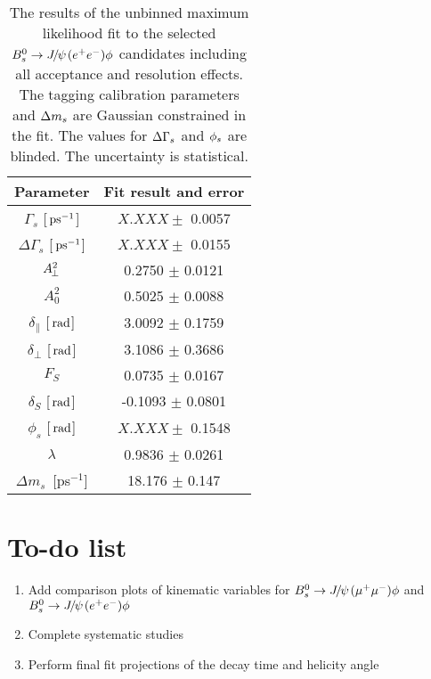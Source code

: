 \begin{table}[htb]
  \caption{
   The results of the unbinned maximum likelihood fit to the selected ${{B}^0_{s}}\rightarrow{\ensuremath{{J\mskip -3mu/\mskip -2mu\psi\mskip 2mu}}}({e^+e^-})\phi$ candidates including all acceptance and resolution effects. The tagging calibration parameters and ${\Delta m_{{s}}}$ are Gaussian constrained in the fit. The values for ${\Delta\Gamma_{{s}}}$ and ${\phi_{{s}}}$ are blinded. The uncertainty is statistical.
}
    \small{
\begin{center}\begin{tabular}{cc}
Parameter & Fit result and error \\ 		\hline
            $\Gamma_{s}$ [${\mathrm{ \,ps}}^{-1}$] &       $X.XXX \pm$ 0.0057                \\
      $\Delta\Gamma_{s}$ [${\mathrm{ \,ps}}^{-1}$]&         $X.XXX \pm$  0.0155                \\
$A_{\hspace{-1pt}\perp}^{2}$ &      0.2750 $\pm$   0.0121                \\
             $A_0^2$ &      0.5025 $\pm$  0.0088                \\
  $\delta_\parallel$ [$\mathrm{ \,rad}$] &       3.0092 $\pm$    0.1759                \\
      $\delta_\perp$ [$\mathrm{ \,rad}$] &          3.1086 $\pm$    0.3686                \\
               $F_S$ &     0.0735 $\pm$   0.0167                \\
          $\delta_S$ [$\mathrm{ \,rad}$] &     -0.1093 $\pm$   0.0801                \\
            $\phi_s$ [$\mathrm{ \,rad}$] &      $X.XXX \pm$    0.1548                \\
           $\lambda$ &      0.9836 $\pm$   0.0261                \\
           $\Delta m_s$~[ps$^{-1}$] &       18.176 $\pm$    0.147                \\
\hline
\end{tabular}\end{center}
  }
\label{tab:FitResultsConcl}
\end{table}
\clearpage

\section{To-do list}
\begin{enumerate}
 \item Add comparison plots of kinematic variables for ${{B}^0_{s}}\rightarrow{\ensuremath{{J\mskip -3mu/\mskip -2mu\psi\mskip 2mu}}}({\mu^+\mu^-})\phi$ and ${{B}^0_{s}}\rightarrow{\ensuremath{{J\mskip -3mu/\mskip -2mu\psi\mskip 2mu}}}({e^+e^-})\phi$
 \item Complete systematic studies
 \item Perform final fit projections of the decay time and helicity angle 
\end{enumerate}
\clearpage